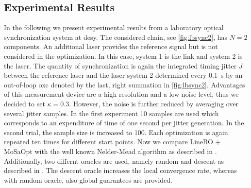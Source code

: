 \documentclass{ifacconf}
\begin{document}
\subsection{Experimental Results} \label{subsec:tuning}
In the following we present experimental results from a laboratory optical synchronization system at \gls{desy}. The considered chain, see \cref{fig:lbsync2}, has \(N = 2 \) components. An additional laser provides the reference signal but is not considered in the optimization. In this case, system 1 is the link and system 2 is the laser. The quantity of synchronization is again the integrated timing jitter \(J\) between the reference laser and the laser system 2 determined every \SI{0.1}{\second} by an out-of-loop \gls{oxc} denoted by the last, right summation in \cref{fig:lbsync2}. Advantages of this measurement device are a high resolution and a low noise level, thus we decided to set \(\kappa = 0.3\). However, the noise is further reduced by averaging over several jitter samples. In the first experiment 10 samples are used which corresponds to an expenditure of time of one second per jitter generation. In the second trial, the sample size is increased to 100. Each optimization is again repeated ten times for different start points. Now we compare LineBO + MoSaOpt with the well known Nelder-Mead algorithm as described in \cite{nelder_mead}. Additionally, two differnt oracles are used, namely random and descent as described in \cite{lineBO}. The descent oracle increases the local convergence rate, whereas with random oracle, also global guarantees are provided.   
\end{document}
